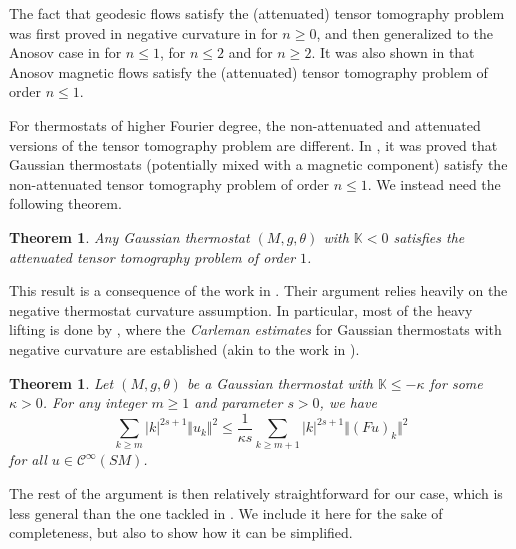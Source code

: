 \documentclass[reqno,12pt,letterpaper]{amsart}
\newtheorem{theorem}[proposition]{Theorem}
\theoremstyle{definition}
\theoremstyle{remark}
\theoremstyle{definition}
\numberwithin{equation}{section}
\begin{document}
The fact that geodesic flows satisfy the (attenuated) tensor tomography problem was first proved in negative curvature in \cite{guillemin80} for $n\geq 0$, and then generalized to the Anosov case in \cite{dairbekov03} for $n \leq 1$, \cite{paternain14} for $n\leq 2$ and \cite{guillarmou17} for $n \geq 2$. It was also shown in \cite{dairbekov05} that Anosov magnetic flows satisfy the (attenuated) tensor tomography problem of order $n\leq 1$. 

For thermostats of higher Fourier degree, the non-attenuated and attenuated versions of the tensor tomography problem are different. In \cite{dairbekov07}, it was proved that Gaussian thermostats (potentially mixed with a magnetic component) satisfy the non-attenuated tensor tomography problem of order $n\leq 1$. We instead need the following theorem.

\begin{theorem}\label{theorem:thermostat-tensor-tomography}
Any Gaussian thermostat $(M, g, \theta)$ with $\mathbb{K} <0$ satisfies the attenuated tensor tomography problem of order $1$.
\end{theorem}

This result is a consequence of the work in \cite{assylbekov21}. Their argument relies heavily on the negative thermostat curvature assumption. In particular, most of the heavy lifting is done by \cite[Theorem 3.1]{assylbekov21}, where the \textit{Carleman estimates} for Gaussian thermostats with negative curvature are established (akin to the work in \cite{paternain23}).

\begin{theorem}\label{theorem:carleman}
Let $(M, g, \theta)$ be a Gaussian thermostat with $\mathbb{K}\leq -\kappa$ for some $\kappa>0$. For any integer $m\geq 1$ and parameter $s>0$, we have
$$\sum_{k\geq m} |k|^{2s+1}\Vert u_k\Vert^2\leq \dfrac{1}{\kappa s}\sum_{k\geq m+1} |k|^{2s+1}\Vert (Fu)_k\Vert^2$$
for all $u\in \mathcal{C}^\infty(SM)$. 
\end{theorem}


The rest of the argument is then relatively straightforward for our case, which is less general than the one tackled in \cite{assylbekov21}. We include it here for the sake of completeness, but also to show how it can be simplified.
\end{document}
